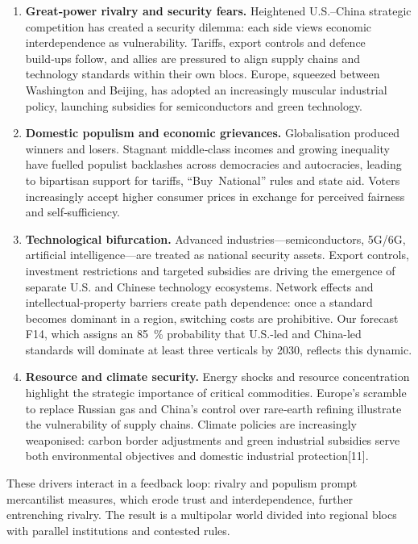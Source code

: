 \documentclass[12pt]{article}
\begin{document}
\begin{enumerate}[label=\arabic*.]
\item \textbf{Great‑power rivalry and security fears.}  Heightened U.S.–China strategic competition has created a security dilemma: each side views economic interdependence as vulnerability.  Tariffs, export controls and defence build‑ups follow, and allies are pressured to align supply chains and technology standards within their own blocs.  Europe, squeezed between Washington and Beijing, has adopted an increasingly muscular industrial policy, launching subsidies for semiconductors and green technology.

\item \textbf{Domestic populism and economic grievances.}  Globalisation produced winners and losers.  Stagnant middle‑class incomes and growing inequality have fuelled populist backlashes across democracies and autocracies, leading to bipartisan support for tariffs, “Buy National” rules and state aid.  Voters increasingly accept higher consumer prices in exchange for perceived fairness and self‑sufficiency.

\item \textbf{Technological bifurcation.}  Advanced industries—semiconductors, 5G/6G, artificial intelligence—are treated as national security assets.  Export controls, investment restrictions and targeted subsidies are driving the emergence of separate U.S. and Chinese technology ecosystems.  Network effects and intellectual‑property barriers create path dependence: once a standard becomes dominant in a region, switching costs are prohibitive.  Our forecast F14, which assigns an 85 \% probability that U.S.-led and China-led standards will dominate at least three verticals by 2030, reflects this dynamic.

\item \textbf{Resource and climate security.}  Energy shocks and resource concentration highlight the strategic importance of critical commodities.  Europe’s scramble to replace Russian gas and China’s control over rare‑earth refining illustrate the vulnerability of supply chains.  Climate policies are increasingly weaponised: carbon border adjustments and green industrial subsidies serve both environmental objectives and domestic industrial protection[11].
\end{enumerate}

These drivers interact in a feedback loop: rivalry and populism prompt mercantilist measures, which erode trust and interdependence, further entrenching rivalry.  The result is a multipolar world divided into regional blocs with parallel institutions and contested rules.
\end{document}
